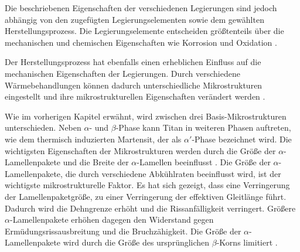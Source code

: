 Die beschriebenen Eigenschaften der verschiedenen Legierungen sind jedoch abhängig von den zugefügten Legierungselementen sowie dem gewählten Herstellungsprozess.
Die Legierungselemente entscheiden größtenteils über die mechanischen und chemischen Eigenschaften wie Korrosion und Oxidation \cite{C.Leyens.2005,Lutjering.2007,M.J.Donachie.2010}.

Der Herstellungsprozess hat ebenfalls einen erheblichen Einfluss auf die mechanischen Eigenschaften der Legierungen. Durch verschiedene Wärmebehandlungen können dadurch unterschiedliche Mikrostrukturen eingestellt und ihre mikrostrukturellen Eigenschaften verändert werden \cite{C.Leyens.2005,Lutjering.2007,Boyer.2007,M.J.Donachie.2010}.

Wie im vorherigen Kapitel erwähnt, wird zwischen drei Basis-Mikrostrukturen unterschieden. Neben $\alpha$- und $\beta$-Phase kann Titan in weiteren Phasen auftreten, wie dem thermisch induzierten Martensit, der als $\alpha'$-Phase bezeichnet wird. Die wichtigsten Eigenschaften der Mikrostrukturen werden durch die Größe der $\alpha$-Lamellenpakete und die Breite der $\alpha$-Lamellen beeinflusst \cite{C.Leyens.2005,Lutjering.2007,Boyer.2007}. Die Größe der $\alpha$-Lamellenpakete, die durch verschiedene Abkühlraten beeinflusst wird, ist der wichtigste mikrostrukturelle Faktor. Es hat sich gezeigt, dass eine Verringerung der Lamellenpaketgröße, zu einer Verringerung der effektiven Gleitlänge führt. Dadurch wird die Dehngrenze erhöht und die Rissanfälligkeit verringert. Größere $\alpha$-Lamellenpakete erhöhen dagegen den Widerstand gegen Ermüdungsrissausbreitung und die Bruchzähigkeit. Die Größe der $\alpha$-Lamellenpakete wird durch die Größe des ursprünglichen $\beta$-Korns limitiert \cite{C.Leyens.2005,Lutjering.2007,M.J.Donachie.2010}.

